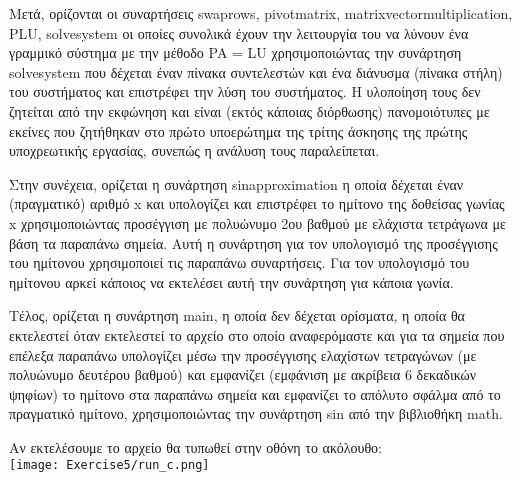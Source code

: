 \documentclass[a4paper,11pt]{article}
\newcommand{\lt}{\latintext}
\begin{document}
\par
Μετά, ορίζονται οι συναρτήσεις {\lt swap\textunderscore rows, pivot\textunderscore matrix, matrix\textunderscore vector\textunderscore multiplication, PLU, solve\textunderscore system} οι οποίες συνολικά έχουν την λειτουργία του να λύνουν ένα γραμμικό σύστημα με την μέθοδο {\lt PA = LU} χρησιμοποιώντας την συνάρτηση {\lt solve\textunderscore system} που δέχεται έναν πίνακα συντελεστών και ένα διάνυσμα (πίνακα στήλη) του συστήματος και επιστρέφει την λύση του συστήματος. Η υλοποίηση τους δεν ζητείται από την εκφώνηση και είναι (εκτός κάποιας διόρθωσης) πανομοιότυπες με εκείνες που ζητήθηκαν στο πρώτο υποερώτημα της τρίτης άσκησης της πρώτης υποχρεωτικής εργασίας, συνεπώς η ανάλυση τους παραλείπεται.\\

\par
Στην συνέχεια, ορίζεται η συνάρτηση {\lt sin\textunderscore approximation} η οποία δέχεται έναν (πραγματικό) αριθμό {\lt x} και υπολογίζει και επιστρέφει το ημίτονο της δοθείσας γωνίας {\lt x} χρησιμοποιώντας προσέγγιση με πολυώνυμο 2ου βαθμού με ελάχιστα τετράγωνα  με βάση τα παραπάνω σημεία. Αυτή η συνάρτηση για τον υπολογισμό της προσέγγισης του ημίτονου χρησιμοποιεί τις παραπάνω συναρτήσεις. Για τον υπολογισμό του ημίτονου αρκεί κάποιος να εκτελέσει αυτή την συνάρτηση για κάποια γωνία.\\

\par
Τέλος, ορίζεται η συνάρτηση {\lt main}, η οποία δεν δέχεται ορίσματα, η οποία θα εκτελεστεί όταν εκτελεστεί το αρχείο στο οποίο αναφερόμαστε και για τα σημεία που επέλεξα παραπάνω υπολογίζει μέσω την προσέγγισης ελαχίστων τετραγώνων (με πολυώνυμο δευτέρου βαθμού) και εμφανίζει  (εμφάνιση με ακρίβεια 6 δεκαδικών ψηφίων) το ημίτονο στα παραπάνω σημεία και εμφανίζει το απόλυτο σφάλμα από το πραγματικό ημίτονο, χρησιμοποιώντας την συνάρτηση {\lt sin} από την βιβλιοθήκη {\lt math}.\\

\par
Αν εκτελέσουμε το αρχείο θα τυπωθεί στην οθόνη το ακόλουθο:\\
\texttt{[image: Exercise5/run\_c.png]}\\
\end{document}
